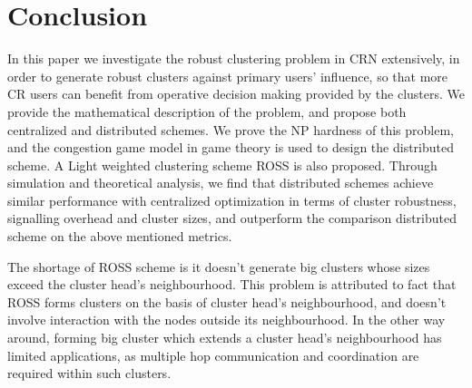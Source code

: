 \documentclass[10pt,journal,compsoc]{IEEEtran}
\theoremstyle{mytheoremstyle}
\theoremstyle{mytheoremstyle}
\theoremstyle{mytheoremstyle}
\begin{document}
\section{Conclusion}
\label{conclusion}
In this paper we investigate the robust clustering problem in CRN extensively, in order to generate robust clusters against primary users' influence, so that more CR users can benefit from operative decision making provided by the clusters.
We provide the mathematical description of the problem, and propose both centralized and distributed schemes.
We prove the NP hardness of this problem, and the congestion game model in game theory is used to design the distributed scheme.
A Light weighted clustering scheme ROSS is also proposed.
Through simulation and theoretical analysis, we find that distributed schemes achieve similar performance with centralized optimization in terms of cluster robustness, signalling overhead and cluster sizes, and outperform the comparison distributed scheme on the above mentioned metrics.


The shortage of ROSS scheme is it doesn't generate big clusters whose sizes exceed the cluster head's neighbourhood.
This problem is attributed to fact that ROSS forms clusters on the basis of cluster head's neighbourhood, and doesn't involve interaction with the nodes outside its neighbourhood.
In the other way around, forming big cluster which extends a cluster head's neighbourhood has limited applications, as multiple hop communication and coordination are required within such clusters.








\end{document}
